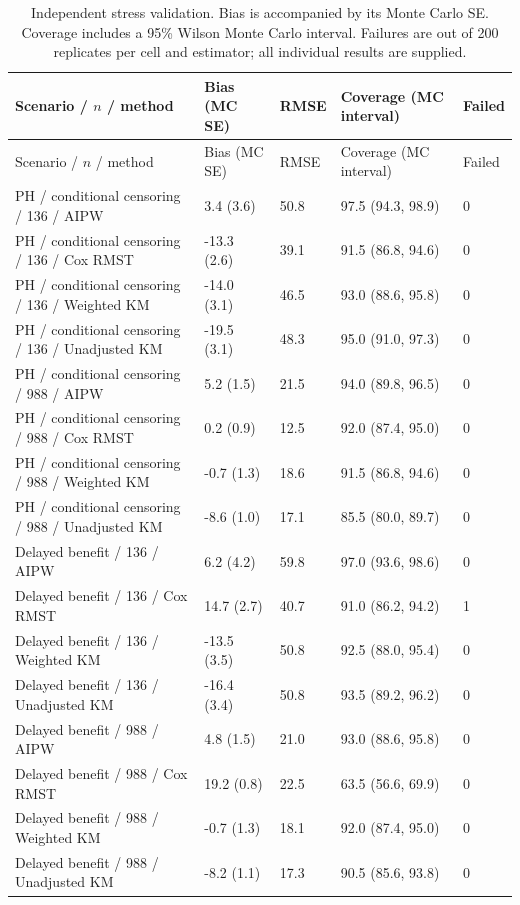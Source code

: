 \documentclass[12pt,letterpaper]{article}
\begin{document}
\begin{longtable}{p{2.0in}p{1.0in}p{0.6in}p{1.7in}p{0.55in}}
\caption{Independent stress validation. Bias is accompanied by its Monte Carlo SE. Coverage includes a 95\% Wilson Monte Carlo interval. Failures are out of 200 replicates per cell and estimator; all individual results are supplied.}\\
\toprule
Scenario / $n$ / method & Bias (MC SE) & RMSE & Coverage (MC interval) & Failed \\
\midrule\endfirsthead
\toprule
Scenario / $n$ / method & Bias (MC SE) & RMSE & Coverage (MC interval) & Failed \\
\midrule\endhead
\bottomrule\endfoot
PH / conditional censoring / 136 / AIPW & 3.4 (3.6) & 50.8 & 97.5 (94.3, 98.9) & 0 \\
PH / conditional censoring / 136 / Cox RMST & -13.3 (2.6) & 39.1 & 91.5 (86.8, 94.6) & 0 \\
PH / conditional censoring / 136 / Weighted KM & -14.0 (3.1) & 46.5 & 93.0 (88.6, 95.8) & 0 \\
PH / conditional censoring / 136 / Unadjusted KM & -19.5 (3.1) & 48.3 & 95.0 (91.0, 97.3) & 0 \\
PH / conditional censoring / 988 / AIPW & 5.2 (1.5) & 21.5 & 94.0 (89.8, 96.5) & 0 \\
PH / conditional censoring / 988 / Cox RMST & 0.2 (0.9) & 12.5 & 92.0 (87.4, 95.0) & 0 \\
PH / conditional censoring / 988 / Weighted KM & -0.7 (1.3) & 18.6 & 91.5 (86.8, 94.6) & 0 \\
PH / conditional censoring / 988 / Unadjusted KM & -8.6 (1.0) & 17.1 & 85.5 (80.0, 89.7) & 0 \\
Delayed benefit / 136 / AIPW & 6.2 (4.2) & 59.8 & 97.0 (93.6, 98.6) & 0 \\
Delayed benefit / 136 / Cox RMST & 14.7 (2.7) & 40.7 & 91.0 (86.2, 94.2) & 1 \\
Delayed benefit / 136 / Weighted KM & -13.5 (3.5) & 50.8 & 92.5 (88.0, 95.4) & 0 \\
Delayed benefit / 136 / Unadjusted KM & -16.4 (3.4) & 50.8 & 93.5 (89.2, 96.2) & 0 \\
Delayed benefit / 988 / AIPW & 4.8 (1.5) & 21.0 & 93.0 (88.6, 95.8) & 0 \\
Delayed benefit / 988 / Cox RMST & 19.2 (0.8) & 22.5 & 63.5 (56.6, 69.9) & 0 \\
Delayed benefit / 988 / Weighted KM & -0.7 (1.3) & 18.1 & 92.0 (87.4, 95.0) & 0 \\
Delayed benefit / 988 / Unadjusted KM & -8.2 (1.1) & 17.3 & 90.5 (85.6, 93.8) & 0 \\

\end{longtable}
\end{document}
